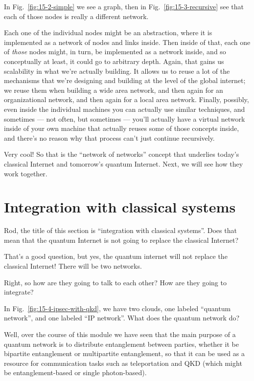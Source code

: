 \mmm In Fig.~\ref{fig:15-2-simple} we see a graph, then in Fig.~\ref{fig:15-3-recursive} see that each of those nodes is really a different network.

\rrr Each one of the individual nodes might be an abstraction, where it is implemented as a network of nodes and links inside. Then inside of that, each one of \emph{those} nodes might, in turn, be implemented as a network inside, and so conceptually at least, it could go to arbitrary depth. Again, that gains us scalability in what we're actually building. It allows us to reuse a lot of the mechanisms that we're designing and building at the level of the global internet; we reuse them when building a wide area network, and then again for an organizational network, and then again for a local area network. Finally, possibly, even inside the individual machines you can actually use similar techniques, and sometimes --- not often, but sometimes --- you'll actually have a virtual network inside of your own machine that actually reuses some of those concepts inside, and there's no reason why that process can't just continue recursively.

\mmm Very cool! So that is the ``network of networks'' concept that underlies today's classical Internet and tomorrow's quantum Internet.  Next, we will see how they work together.

\section{Integration with classical systems}
\label{sec:classical-integration}

\mmm Rod, the title of this section is ``integration with classical systems''. Does that mean that the quantum Internet is not going to replace the classical Internet?

\rrr That's a good question, but yes, the quantum internet will not replace the classical Internet! There will be two networks.

\mmm Right, so how are they going to talk to each other? How are they going to integrate?

\rrr In Fig.~\ref{fig:15-4-ipsec-with-qkd}, we have two clouds, one labeled ``quantum network'', and one labeled ``IP network''. What does the quantum network do?

\mmm Well, over the course of this module we have seen that the main purpose of a quantum network is to distribute entanglement between parties, whether it be bipartite entanglement or multipartite entanglement, so that it can be used as a resource for communication tasks such as teleportation and QKD (which might be entanglement-based or single photon-based).

